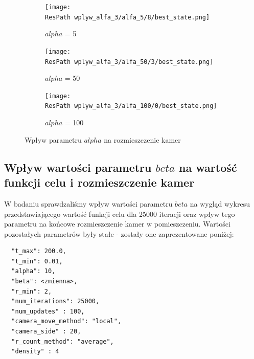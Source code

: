 \documentclass[12pt,a4paper]{article}
\newcommand{\ResPath}{../badania/}
\begin{document}
\begin{figure}[htb]
  \begin{subfigure}[b]{0.5\linewidth}
    \centering
    \texttt{[image: \\ResPath wplyw\_alfa\_3/alfa\_5/8/best\_state.png]}
    \caption{$alpha$ = 5}
    \label{fig_alfa_best_state:a}
    \vspace{2ex}
  \end{subfigure}%
  \begin{subfigure}[b]{0.5\linewidth}
    \texttt{[image: \\ResPath wplyw\_alfa\_3/alfa\_50/3/best\_state.png]}
    \caption{$alpha$ = 50}
    \label{fig_alfa_best_state:b}
    \vspace{2ex}
  \end{subfigure}
  \begin{subfigure}[b]{0.5\linewidth}
    \centering
    \texttt{[image: \\ResPath wplyw\_alfa\_3/alfa\_100/0/best\_state.png]}
    \caption{$alpha$ = 100}
    \label{fig_alfa_best_state:c}
  \end{subfigure}%

  \caption{Wpływ parametru $alpha$ na rozmieszczenie kamer}
  \label{fig_alfa_best_state}
\end{figure}
\restoregeometry

\subsection{Wpływ wartości parametru $beta$ na wartość funkcji celu i rozmieszczenie kamer}
W badaniu sprawdzaliśmy wpływ wartości parametru $beta$ na wygląd wykresu
przedstawiającego wartość funkcji celu dla 25000 iteracji oraz wpływ tego
parametru na końcowe rozmieszczenie kamer w pomieszczeniu. Wartości pozostałych
parametrów były stałe - zostały one zaprezentowane poniżej:

\begin{lstlisting}
  "t_max": 200.0,
  "t_min": 0.01,
  "alpha": 10,
  "beta": <zmienna>,
  "r_min": 2,
  "num_iterations": 25000,
  "num_updates" : 100,
  "camera_move_method": "local",
  "camera_side" : 20,
  "r_count_method": "average",
  "density" : 4
\end{lstlisting}
\end{document}
